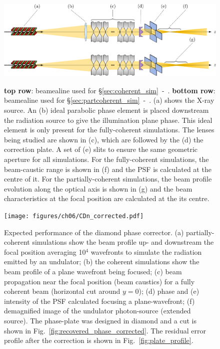 \begin{refsection}
\begin{figure}[t]
        \centering
        {\includegraphics[width=0.8\linewidth]{figures/ch06/optical_setups_corrected.pdf}}
        \caption[Beamlines for coherent- and partially-coherent simulations]{\textbf{top row}: beamealine used for  \S\ref{sec:coherent_sim}~-~\textit{}. \textbf{bottom row}: beamealine used for  \S\ref{sec:partcoherent_sim}~-~\textit{}. (a) shows the X-ray source. An (b) ideal parabolic phase element is placed downstream the radiation source to give the illumination plane phase. This ideal element is only present for the fully-coherent simulations. The lenses being studied are shown in (c), which are followed by the (d) the correction plate. A set of (e) slits to ensure the same geometric aperture for all simulations. For the fully-coherent simulations, the beam-caustic range is shown in (f) and the PSF is calculated at the centre of it. For the partially-coherent simulations, the beam profile evolution along the optical axis is shown in (g) and the beam characteristics at the focal position are calculated at the its centre. 
        }\label{fig:optical_setups_corrected}
\end{figure}


\begin{figure}[h]
        \centering
        {\texttt{[image: figures/ch06/CDn\_corrected.pdf]}}
        \caption[Expected performance of the diamond phase corrector]{Expected performance of the diamond phase corrector. (a) partially-coherent simulations show the beam profile up- and downstream the focal position averaging 10$^{4}$ wavefronts to simulate the radiation emitted by an undulator; (b) the coherent simulations show the beam profile of a plane wavefront being focused; (c) beam propagation near the focal position (beam caustics) for a fully coherent beam (horizontal cut around $y=0$); (d) phase and (e) intensity of the PSF calculated focusing a plane-wavefront; (f) demagnified image of the undulator photon-source (extended source). The phase-plate was designed in diamond and a cut is shown in Fig.~\ref{fig:recovered_phase_corrected}. The residual error profile after the correction is shown in Fig.~\ref{fig:plate_profile}.}\label{fig:CDn_corrected}
\end{figure}


\end{refsection}
